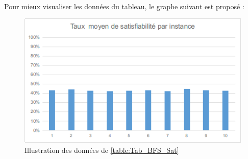 \paragraph{}Pour mieux visualiser les données du tableau, le graphe suivant est proposé :\\

\begin{figure}[H]
	\includegraphics[width=\textwidth]{images/BFSUF75Graph.png}
	\caption{Illustration des données de \ref{table:Tab_BFS_Sat}}
\end{figure}
\newpage
